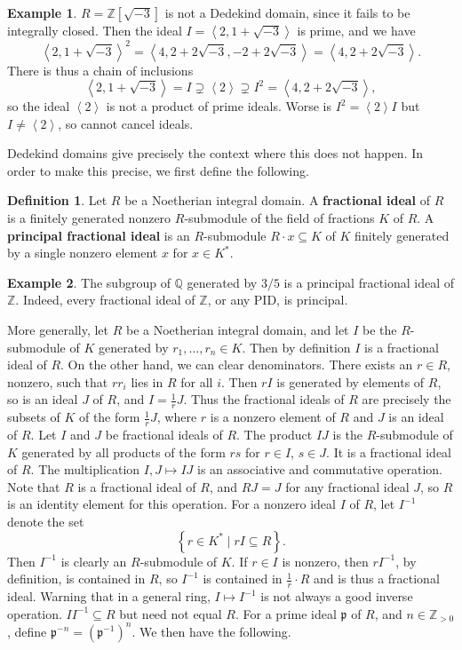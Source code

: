 \documentclass{article}
\newcommand{\Z}{\mathbb{Z}}
\newcommand{\Q}{\mathbb{Q}}
\newcommand{\rb}[1]{\left( #1 \right)}
\renewcommand{\sb}[1]{\left[ #1 \right]}
\newcommand{\cb}[1]{\left\{ #1 \right\}}
\newcommand{\ab}[1]{\left\langle #1 \right\rangle}
\theoremstyle{definition}\newtheorem{definition}{Definition}[subsection]
\theoremstyle{definition}\newtheorem{remark}[definition]{Remark}
\theoremstyle{definition}\newtheorem*{example}{Example}
\theoremstyle{definition}\newtheorem*{note}{Note}
\begin{document}
\begin{example}
$ R = \Z\sb{\sqrt{-3}} $ is not a Dedekind domain, since it fails to be integrally closed. Then the ideal $ I = \ab{2, 1 + \sqrt{-3}} $ is prime, and we have
$$ \ab{2, 1 + \sqrt{-3}}^2 = \ab{4, 2 + 2\sqrt{-3}, -2 + 2\sqrt{-3}} = \ab{4, 2 + 2\sqrt{-3}}. $$
There is thus a chain of inclusions
$$ \ab{2, 1 + \sqrt{-3}} = I \supsetneq \ab{2} \supsetneq I^2 = \ab{4, 2 + 2\sqrt{-3}}, $$
so the ideal $ \ab{2} $ is not a product of prime ideals. Worse is $ I^2 = \ab{2}I $ but $ I \ne \ab{2} $, so cannot cancel ideals.
\end{example}

Dedekind domains give precisely the context where this does not happen. In order to make this precise, we first define the following.

\begin{definition}
Let $ R $ be a Noetherian integral domain. A \textbf{fractional ideal} of $ R $ is a finitely generated nonzero $ R $-submodule of the field of fractions $ K $ of $ R $. A \textbf{principal fractional ideal} is an $ R $-submodule $ R \cdot x \subseteq K $ of $ K $ finitely generated by a single nonzero element $ x $ for $ x \in K^* $.
\end{definition}

\begin{example}
The subgroup of $ \Q $ generated by $ 3 / 5 $ is a principal fractional ideal of $ \Z $. Indeed, every fractional ideal of $ \Z $, or any PID, is principal.
\end{example}

More generally, let $ R $ be a Noetherian integral domain, and let $ I $ be the $ R $-submodule of $ K $ generated by $ r_1, \dots, r_n \in K $. Then by definition $ I $ is a fractional ideal of $ R $. On the other hand, we can clear denominators. There exists an $ r \in R $, nonzero, such that $ rr_i $ lies in $ R $ for all $ i $. Then $ rI $ is generated by elements of $ R $, so is an ideal $ J $ of $ R $, and $ I = \tfrac{1}{r}J $. Thus the fractional ideals of $ R $ are precisely the subsets of $ K $ of the form $ \tfrac{1}{r}J $, where $ r $ is a nonzero element of $ R $ and $ J $ is an ideal of $ R $. Let $ I $ and $ J $ be fractional ideals of $ R $. The product $ IJ $ is the $ R $-submodule of $ K $ generated by all products of the form $ rs $ for $ r \in I $, $ s \in J $. It is a fractional ideal of $ R $. The multiplication $ I, J \mapsto IJ $ is an associative and commutative operation. Note that $ R $ is a fractional ideal of $ R $, and $ RJ = J $ for any fractional ideal $ J $, so $ R $ is an identity element for this operation. For a nonzero ideal $ I $ of $ R $, let $ I^{-1} $ denote the set
$$ \cb{r \in K^* \mid rI \subseteq R}. $$
Then $ I^{-1} $ is clearly an $ R $-submodule of $ K $. If $ r \in I $ is nonzero, then $ rI^{-1} $, by definition, is contained in $ R $, so $ I^{-1} $ is contained in $ \tfrac{1}{r} \cdot R $ and is thus a fractional ideal. Warning that in a general ring, $ I \mapsto I^{-1} $ is not always a good inverse operation. $ II^{-1} \subseteq R $ but need not equal $ R $. For a prime ideal $ \mathfrak{p} $ of $ R $, and $ n \in \Z_{> 0} $, define $ \mathfrak{p}^{-n} = \rb{\mathfrak{p}^{-1}}^n $. We then have the following.
\end{document}
